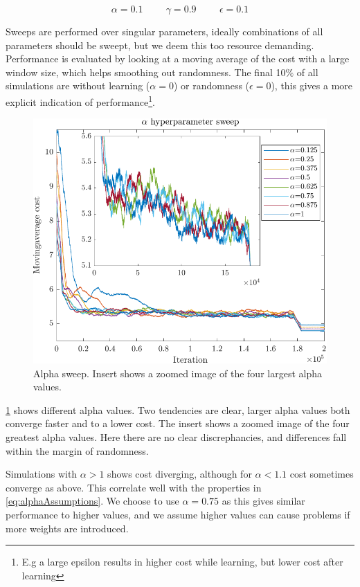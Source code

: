 \begin{equation*}
	\alpha = 0.1 \hspace{1cm} \gamma = 0.9 \hspace{1cm} \epsilon = 0.1
\end{equation*}

Sweeps are performed over singular parameters, ideally combinations of all parameters should be sweept, but we deem this too resource demanding. Performance is evaluated by looking at a moving average of the cost with a large window size, which helps smoothing out randomness. The final 10$\%$ of all simulations are without learning ($\alpha = 0$) or randomness ($\epsilon = 0$), this gives a more explicit indication of performance\footnote{E.g a large epsilon results in higher cost while learning, but lower cost after learning}. 

\begin{figure}[h!]
	\centering
	\includegraphics[width=0.7\linewidth]{figures/AlphaSweepApproxBest.pdf}
	\caption{Alpha sweep. Insert shows a zoomed image of the four largest alpha values.}
	\label{fig:AlphaSweep}
\end{figure} 

\cref{fig:AlphaSweep} shows different alpha values. Two tendencies are clear, larger alpha values both converge faster and to a lower cost. The insert shows a zoomed image of the four greatest alpha values. Here there are no clear discrephancies, and differences fall within the margin of randomness.

Simulations with $\alpha > 1$ shows cost diverging, although for $\alpha < 1.1$ cost sometimes converge as above. This correlate well with the properties in \cref{eq:alphaAssumptions}. We choose to use $\alpha = 0.75$ as this gives similar performance to higher values, and we assume higher values can cause problems if more weights are introduced.

